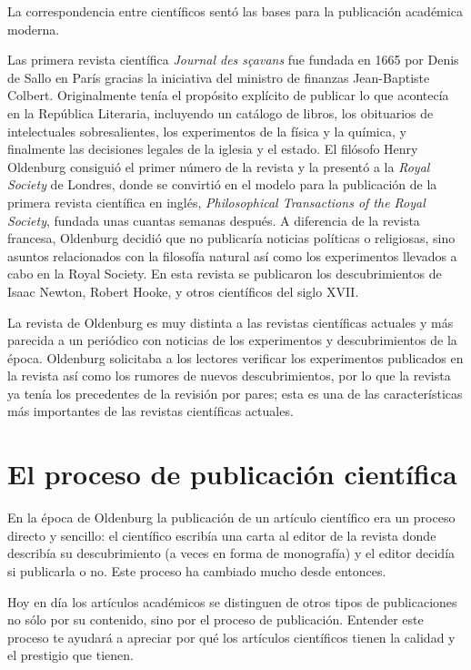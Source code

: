\begin{remember}
    La correspondencia entre científicos sentó las bases para la publicación
    académica moderna.
\end{remember}

Las primera revista científica \emph{Journal des sçavans} fue fundada en 1665
por Denis de Sallo en París gracias la iniciativa del ministro de finanzas
Jean-Baptiste Colbert.
Originalmente tenía el propósito explícito de publicar lo que acontecía en la
República Literaria, incluyendo un catálogo de libros, los obituarios de
intelectuales sobresalientes, los experimentos de la física y la química, y
finalmente las decisiones legales de la iglesia y el estado\cite{Fyfe2022-ca}.
El filósofo Henry Oldenburg consiguió el primer número de la revista y la
presentó a la \emph{Royal Society} de Londres, donde se convirtió en el modelo
para la publicación de la primera revista científica en inglés,
\emph{Philosophical Transactions of the Royal Society}, fundada unas cuantas
semanas después.
A diferencia de la revista francesa, Oldenburg decidió que no publicaría
noticias políticas o religiosas, sino asuntos relacionados con la filosofía
natural así como los experimentos llevados a cabo en la Royal Society.
En esta revista se publicaron los descubrimientos de Isaac Newton, Robert Hooke,
y otros científicos del siglo XVII.

La revista de Oldenburg es muy distinta a las revistas científicas actuales y
más parecida a un periódico con noticias de los experimentos y descubrimientos
de la época.
Oldenburg solicitaba a los lectores verificar los experimentos publicados en la
revista así como los rumores de nuevos descubrimientos, por lo que la revista
ya tenía los precedentes de la revisión por pares; esta es una de las
características más importantes de las revistas científicas actuales.

\section{El proceso de publicación científica}
\label{sec:procesopublicacion}
En la época de Oldenburg la publicación de un artículo científico era un proceso
directo y sencillo: el científico escribía una carta al editor de la revista
donde describía su descubrimiento (a veces en forma de monografía) y el editor
decidía si publicarla o no.
Este proceso ha cambiado mucho desde entonces.

Hoy en día los artículos académicos se distinguen de otros tipos de
publicaciones no sólo por su contenido, sino por el proceso de publicación.
Entender este proceso te ayudará a apreciar por qué los artículos científicos
tienen la calidad y el prestigio que tienen.

